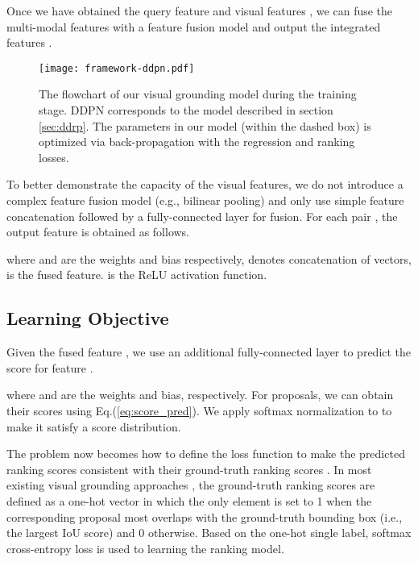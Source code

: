 \documentclass{article}
\begin{document}
Once we have obtained the query feature  and visual features , we can fuse the multi-modal features with a feature fusion model and output the integrated features .

\begin{figure}
\begin{center}
\texttt{[image: framework-ddpn.pdf]}
\vspace{-15pt}
\caption{The flowchart of our visual grounding model during the training stage. DDPN corresponds to the model described in section \ref{sec:ddrp}. The parameters in our model (within the dashed box) is optimized via back-propagation with the regression and ranking losses.}
\label{fig:baseline}
\end{center}
\vspace{-15pt}
\end{figure}

To better demonstrate the capacity of the visual features, we do not introduce a complex feature fusion model (e.g., bilinear pooling) and only use simple feature concatenation followed by a fully-connected layer for fusion. For each pair , the output feature  is obtained as follows.

where  and  are the weights and bias respectively,  denotes concatenation of vectors,  is the fused feature.  is the ReLU activation function.

\subsection{Learning Objective}
Given the fused feature , we use an additional fully-connected layer to predict the score  for feature .

where  and  are the weights and bias, respectively. For  proposals, we can obtain their scores  using Eq.(\ref{eq:score_pred}). We apply softmax normalization to  to make it satisfy a score distribution.

The problem now becomes how to define the loss function to make the predicted ranking scores  consistent with their ground-truth ranking scores . In most existing visual grounding approaches \cite{fukui2016multimodal,hu2016natural,chen2017query}, the ground-truth ranking scores  are defined as a one-hot vector in which the only element is set to 1 when the corresponding proposal most overlaps with the ground-truth bounding box (i.e., the largest IoU score) and 0 otherwise. Based on the one-hot single label, softmax cross-entropy loss is used to learning the ranking model.
\end{document}
